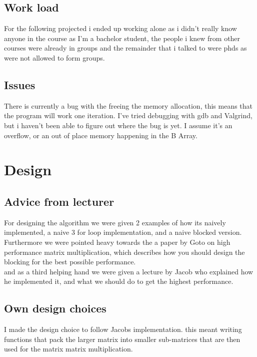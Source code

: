 \documentclass[a4paper,10pt,titlepage]{report}
\begin{document}
\subsection{Work load}
For the following projected i ended up working alone as i didn't really know anyone in the course as I'm a bachelor student, the people i knew from other courses were already in groups and the remainder that i talked to were phds as were not allowed to form groups. 

\subsection{Issues}
There is currently a bug with the freeing the memory allocation, this means that the program will work one iteration. I've tried debugging with gdb and Valgrind, but i haven't been able to figure out where the bug is yet. I assume it's an overflow, or an out of place memory happening in the B Array.


\section{Design}
\subsection{Advice from lecturer}
For designing the algorithm we were given 2 examples of how its naively implemented, a naive 3 for loop implementation, and a naive blocked version. \\ \vspace{5mm}
Furthermore we were pointed heavy towards the a paper by Goto on high performance matrix multiplication, which describes how you should design the blocking for the best possible performance. \\ \vspace{5mm}
and as a third helping hand we were given a lecture by Jacob who explained how he implemented it, and what we should do to get the highest performance.
\subsection{Own design choices}

I made the design choice to follow Jacobs implementation. this meant writing functions that pack the larger matrix into smaller sub-matrices that are then used for the matrix matrix multiplication. \\
\end{document}
